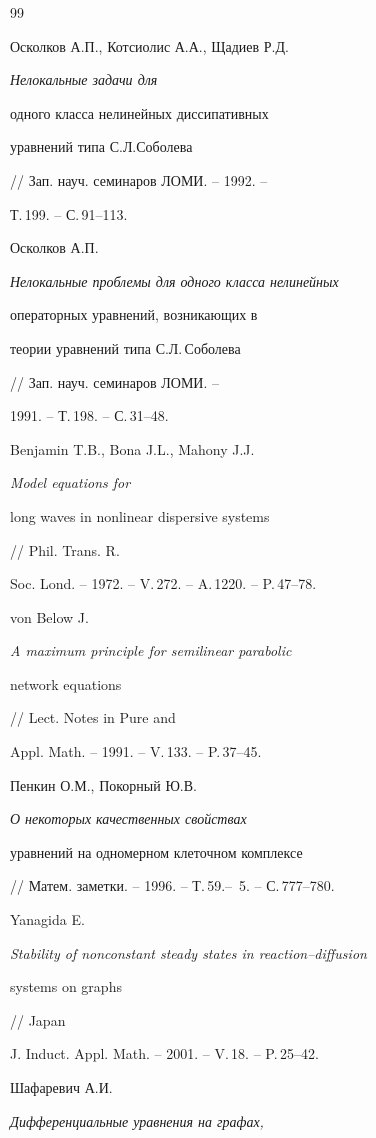 \begin{thebibliography}{99}







Осколков А.П., Котсиолис А.А., Щадиев Р.Д. {\it Нелокальные задачи для 


одного класса нелинейных диссипативных


уравнений типа С.Л.Соболева} // Зап. науч. семинаров ЛОМИ. -- 1992. --


Т.\,199. -- С.\,91--113.




Осколков А.П. {\it Нелокальные проблемы для одного класса нелинейных 


операторных уравнений, возникающих в


теории уравнений типа С.Л.\,Соболева} // Зап. науч. семинаров ЛОМИ. --


1991. -- Т.\,198. -- С.\,31--48.




Benjamin T.B., Bona J.L., Mahony J.J. {\it Model equations for


long waves in nonlinear dispersive systems} // Phil. Trans. R.


Soc. Lond. -- 1972. -- V.\,272. -- A.\,1220. -- P.\,47--78.




von Below J. {\it A maximum principle for semilinear parabolic 


network equations} // Lect. Notes in Pure and


Appl. Math. -- 1991. -- V.\,133. -- P.\,37--45.




Пенкин О.М., Покорный Ю.В. {\it О некоторых качественных свойствах 


уравнений на одномерном клеточном комплексе}


// Матем. заметки. -- 1996. -- Т.\,59.-- \No\,5. -- С.\,777--780.




Yanagida E. {\it Stability of nonconstant steady states in reaction--diffusion


systems on graphs} // Japan


J. Induct. Appl. Math. -- 2001. -- V.\,18. -- P.\,25--42.




Шафаревич А.И. {\it Дифференциальные уравнения на графах, 


}
\end{thebibliography}
